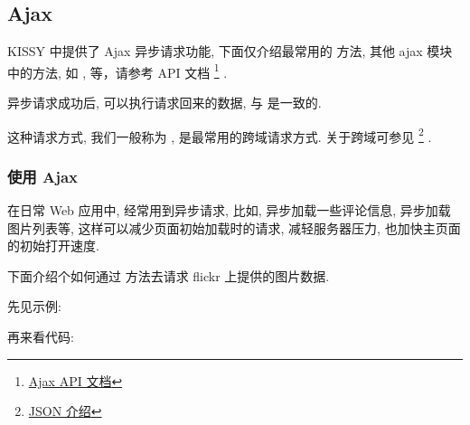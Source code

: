 \documentclass[letterpaper,10pt,english]{sphinxmanual}
\begin{document}
\subsection{Ajax}
\label{quickstart/ajax:ajax}\label{quickstart/ajax::doc}\label{quickstart/ajax:id1}
KISSY 中提供了 Ajax 异步请求功能, 下面仅介绍最常用的  方法, 其他 ajax 模块中的方法, 如 ,  等，请参考 API 文档 \footnote{
\href{http://kissyteam.github.com/KISSY/docs/ajax/index.html}{Ajax API 文档}
} .

 异步请求成功后, 可以执行请求回来的数据, 与  是一致的.

这种请求方式, 我们一般称为 , 是最常用的跨域请求方式. 关于跨域可参见 \footnote{
\href{http://en.wikipedia.org/wiki/JSON}{JSON 介绍}
} .


\subsubsection{使用 Ajax}
\label{quickstart/ajax:id4}
在日常 Web 应用中, 经常用到异步请求, 比如, 异步加载一些评论信息, 异步加载图片列表等, 这样可以减少页面初始加载时的请求, 减轻服务器压力, 也加快主页面的初始打开速度.

下面介绍个如何通过  方法去请求 flickr 上提供的图片数据.

先见示例:

再来看代码:
\end{document}
